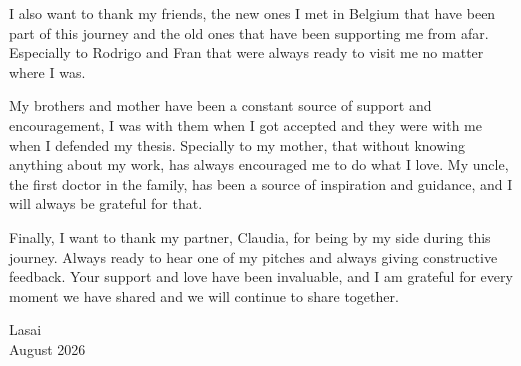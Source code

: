  I also want to thank my friends, the new ones I met in Belgium that have been part of this journey and the old ones that have been supporting me from afar. Especially to Rodrigo and Fran that were always ready to visit me no matter where I was. 

My brothers and mother have been a constant source of support and encouragement, I was with them when I got accepted and they were with me when I defended my thesis. Specially to my mother, that without knowing anything about my work, has always encouraged me to do what I love. My uncle, the first doctor in the family, has been a source of inspiration and guidance, and I will always be grateful for that. 

Finally, I want to thank my partner, Claudia, for being by my side during this journey. Always ready to hear one of my pitches and always giving constructive feedback. Your support and love have been invaluable, and I am grateful for every moment we have shared and we will continue to share together.





{\raggedleft
Lasai \\
August 2026 \\
}